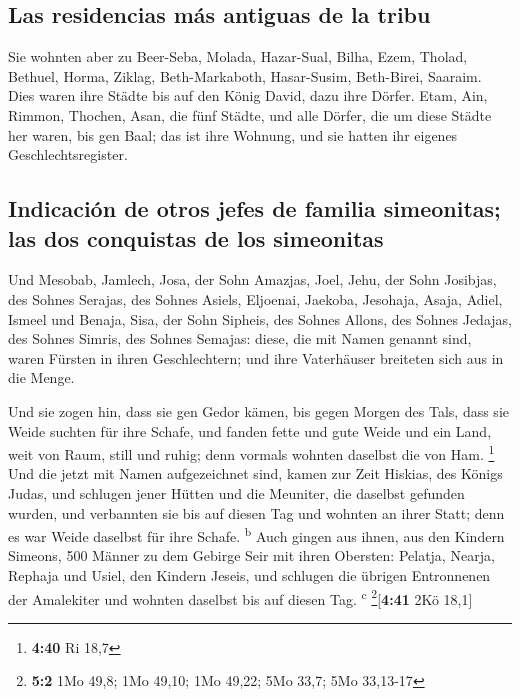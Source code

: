 \hypertarget{las-residencias-muxe1s-antiguas-de-la-tribu}{%
\subsection{Las residencias más antiguas de la
tribu}\label{las-residencias-muxe1s-antiguas-de-la-tribu}}

 Sie wohnten aber zu Beer-Seba, Molada, Hazar-Sual,
 Bilha, Ezem, Tholad,  Bethuel, Horma,
Ziklag,  Beth-Markaboth, Hasar-Susim, Beth-Birei,
Saaraim. Dies waren ihre Städte bis auf den König David, dazu ihre
Dörfer.  Etam, Ain, Rimmon, Thochen, Asan, die fünf
Städte,  und alle Dörfer, die um diese Städte her waren,
bis gen Baal; das ist ihre Wohnung, und sie hatten ihr eigenes
Geschlechtsregister.

\hypertarget{indicaciuxf3n-de-otros-jefes-de-familia-simeonitas-las-dos-conquistas-de-los-simeonitas}{%
\subsection{Indicación de otros jefes de familia simeonitas; las dos
conquistas de los
simeonitas}\label{indicaciuxf3n-de-otros-jefes-de-familia-simeonitas-las-dos-conquistas-de-los-simeonitas}}

 Und Mesobab, Jamlech, Josa, der Sohn Amazjas,
 Joel, Jehu, der Sohn Josibjas, des Sohnes Serajas, des
Sohnes Asiels,  Eljoenai, Jaekoba, Jesohaja, Asaja,
Adiel, Ismeel und Benaja,  Sisa, der Sohn Sipheis, des
Sohnes Allons, des Sohnes Jedajas, des Sohnes Simris, des Sohnes
Semajas:  diese, die mit Namen genannt sind, waren
Fürsten in ihren Geschlechtern; und ihre Vaterhäuser breiteten sich aus
in die Menge.

 Und sie zogen hin, dass sie gen Gedor kämen, bis gegen
Morgen des Tals, dass sie Weide suchten für ihre Schafe, 
und fanden fette und gute Weide und ein Land, weit von Raum, still und
ruhig; denn vormals wohnten daselbst die von Ham. \footnote{\textbf{4:40}
  Ri 18,7}  Und die jetzt mit Namen aufgezeichnet sind,
kamen zur Zeit Hiskias, des Königs Judas, und schlugen jener Hütten und
die Meuniter, die daselbst gefunden wurden, und verbannten sie bis auf
diesen Tag und wohnten an ihrer Statt; denn es war Weide daselbst für
ihre Schafe. \textsuperscript{b}  Auch gingen aus ihnen,
aus den Kindern Simeons, 500 Männer zu dem Gebirge Seir mit ihren
Obersten: Pelatja, Nearja, Rephaja und Usiel, den Kindern Jeseis,
 und schlugen die übrigen Entronnenen der Amalekiter und
wohnten daselbst bis auf diesen Tag. \textsuperscript{c}
\footnote{\textbf{5:2} 1Mo 49,8; 1Mo 49,10; 1Mo 49,22; 5Mo 33,7; 5Mo
  33,13-17}{[}\textbf{4:41} 2Kö 18,1{]}

